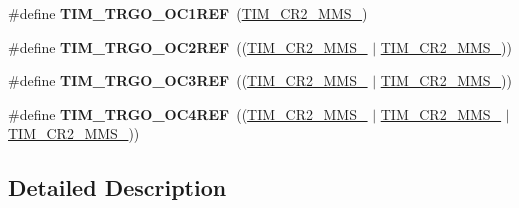 \begin{DoxyCompactItemize}
\#define {\bfseries T\+I\+M\+\_\+\+T\+R\+G\+O\+\_\+\+O\+C1\+R\+EF}~(\hyperlink{group___peripheral___registers___bits___definition_gacb74a815afdd856d51cfcf1ddf3fce6a}{T\+I\+M\+\_\+\+C\+R2\+\_\+\+M\+M\+S\+\_})
\item 
\mbox{\label{group___t_i_m___master___mode___selection_gaaedc4b3f4c5c3c8b45a2cf1b73e33c0a}} 
\#define {\bfseries T\+I\+M\+\_\+\+T\+R\+G\+O\+\_\+\+O\+C2\+R\+EF}~((\hyperlink{group___peripheral___registers___bits___definition_gacb74a815afdd856d51cfcf1ddf3fce6a}{T\+I\+M\+\_\+\+C\+R2\+\_\+\+M\+M\+S\+\_} $\vert$ \hyperlink{group___peripheral___registers___bits___definition_gaf3e55308e84106d6501201e66bd46ab6}{T\+I\+M\+\_\+\+C\+R2\+\_\+\+M\+M\+S\+\_}))
\item 
\mbox{\label{group___t_i_m___master___mode___selection_ga4bc4791f8b9560950d30078b96d08f55}} 
\#define {\bfseries T\+I\+M\+\_\+\+T\+R\+G\+O\+\_\+\+O\+C3\+R\+EF}~((\hyperlink{group___peripheral___registers___bits___definition_gacb74a815afdd856d51cfcf1ddf3fce6a}{T\+I\+M\+\_\+\+C\+R2\+\_\+\+M\+M\+S\+\_} $\vert$ \hyperlink{group___peripheral___registers___bits___definition_ga4b1036929b0a4ba5bd5cced9b8e0f4c3}{T\+I\+M\+\_\+\+C\+R2\+\_\+\+M\+M\+S\+\_}))
\item 
\mbox{\label{group___t_i_m___master___mode___selection_ga7fe6228adec5d1b6f0a8ed8da111db4d}} 
\#define {\bfseries T\+I\+M\+\_\+\+T\+R\+G\+O\+\_\+\+O\+C4\+R\+EF}~((\hyperlink{group___peripheral___registers___bits___definition_gacb74a815afdd856d51cfcf1ddf3fce6a}{T\+I\+M\+\_\+\+C\+R2\+\_\+\+M\+M\+S\+\_} $\vert$ \hyperlink{group___peripheral___registers___bits___definition_ga4b1036929b0a4ba5bd5cced9b8e0f4c3}{T\+I\+M\+\_\+\+C\+R2\+\_\+\+M\+M\+S\+\_} $\vert$ \hyperlink{group___peripheral___registers___bits___definition_gaf3e55308e84106d6501201e66bd46ab6}{T\+I\+M\+\_\+\+C\+R2\+\_\+\+M\+M\+S\+\_}))
\end{DoxyCompactItemize}


\subsection{Detailed Description}
